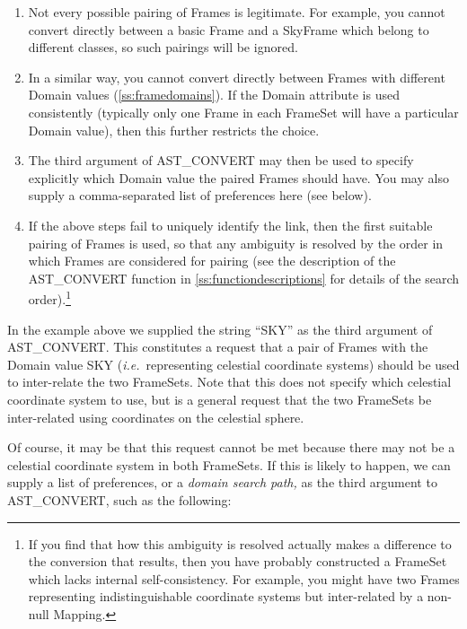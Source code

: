\documentclass[twoside,11pt]{article}
\newcommand{\htmlref}[2]{#1}
\newcommand{\appref}[1]{Appendix~\ref{#1}}
\newcommand{\secref}[1]{\S\ref{#1}}
\renewcommand{\appref}[1]{\ref{#1}}
\renewcommand{\secref}[1]{\ref{#1}}
\begin{document}
\begin{enumerate}
\item Not every possible pairing of Frames is legitimate. For example,
you cannot convert directly between a basic Frame and a \htmlref{SkyFrame}{SkyFrame} which
belong to different classes, so such pairings will be ignored.

\item In a similar way, you cannot convert directly between Frames
with different Domain values (\secref{ss:framedomains}). If the Domain
attribute is used consistently (typically only one Frame in each
FrameSet will have a particular Domain value), then this further
restricts the choice.

\item The third argument of AST\_CONVERT may then be used to specify
explicitly which Domain value the paired Frames should have. You may
also supply a comma-separated list of preferences here (see below).

\item If the above steps fail to uniquely identify the link, then the
first suitable pairing of Frames is used, so that any ambiguity is
resolved by the order in which Frames are considered for pairing (see
the description of the AST\_CONVERT function in
\appref{ss:functiondescriptions} for details of the search
order).\footnote{If you find that how this ambiguity is resolved
actually makes a difference to the conversion that results, then you
have probably constructed a FrameSet which lacks internal
self-consistency. For example, you might have two Frames representing
indistinguishable coordinate systems but inter-related by a non-null
\htmlref{Mapping}{Mapping}.}
\end{enumerate}

In the example above we supplied the string ``SKY'' as the third
argument of AST\_CONVERT. This constitutes a request that a pair of
Frames with
the Domain value SKY ({\em{i.e.}}\ representing celestial coordinate
systems) should be used to inter-relate the two FrameSets. Note that
this does not specify which celestial coordinate system to use, but is
a general request that the two FrameSets be inter-related using
coordinates on the celestial sphere.

Of course, it may be that this request cannot be met because there may
not be a celestial coordinate system in both FrameSets. If this is
likely to happen, we can supply a list of preferences, or a
{\em{domain search path,}}
as the third argument to AST\_CONVERT, such as
the following:
\end{document}
